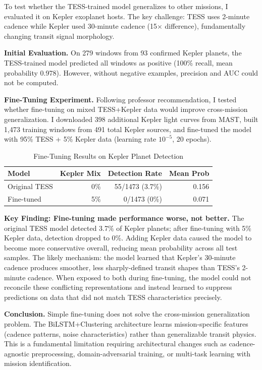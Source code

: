\documentclass[letterpaper]{article} %
\begin{document}
To test whether the TESS-trained model generalizes to other missions, I evaluated it on Kepler exoplanet hosts. The key challenge: TESS uses 2-minute cadence while Kepler used 30-minute cadence (15$\times$ difference), fundamentally changing transit signal morphology.

\textbf{Initial Evaluation.} On 279 windows from 93 confirmed Kepler planets, the TESS-trained model predicted all windows as positive (100\% recall, mean probability 0.978). However, without negative examples, precision and AUC could not be computed.

\textbf{Fine-Tuning Experiment.} Following professor recommendation, I tested whether fine-tuning on mixed TESS+Kepler data would improve cross-mission generalization. I downloaded 398 additional Kepler light curves from MAST, built 1,473 training windows from 491 total Kepler sources, and fine-tuned the model with 95\% TESS + 5\% Kepler data (learning rate $10^{-5}$, 20 epochs).

\begin{table}[h]
\centering
\caption{Fine-Tuning Results on Kepler Planet Detection}
\label{tab:finetuning_results}
\begin{tabular}{@{}lrrr@{}}
\toprule
\textbf{Model} & \textbf{Kepler Mix} & \textbf{Detection Rate} & \textbf{Mean Prob} \\
\midrule
Original TESS & 0\% & 55/1473 (3.7\%) & 0.156 \\
Fine-tuned & 5\% & 0/1473 (0\%) & 0.071 \\
\bottomrule
\end{tabular}
\end{table}

\textbf{Key Finding: Fine-tuning made performance worse, not better.} The original TESS model detected 3.7\% of Kepler planets; after fine-tuning with 5\% Kepler data, detection dropped to 0\%. Adding Kepler data caused the model to become more conservative overall, reducing mean probability across all test samples. The likely mechanism: the model learned that Kepler's 30-minute cadence produces smoother, less sharply-defined transit shapes than TESS's 2-minute cadence. When exposed to both during fine-tuning, the model could not reconcile these conflicting representations and instead learned to suppress predictions on data that did not match TESS characteristics precisely.

\textbf{Conclusion.} Simple fine-tuning does not solve the cross-mission generalization problem. The BiLSTM+Clustering architecture learns mission-specific features (cadence patterns, noise characteristics) rather than generalizable transit physics. This is a fundamental limitation requiring architectural changes such as cadence-agnostic preprocessing, domain-adversarial training, or multi-task learning with mission identification.
\end{document}
